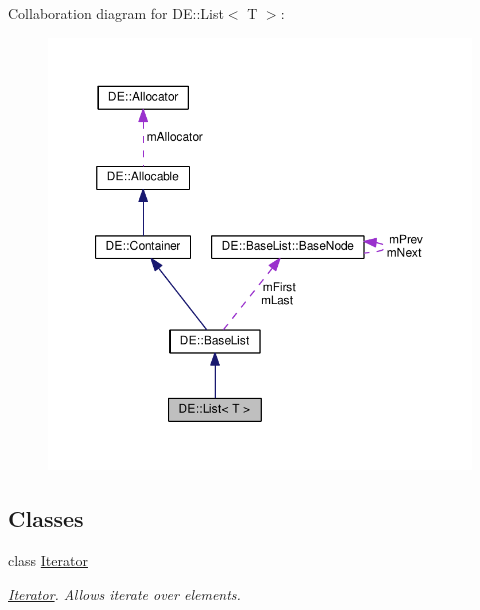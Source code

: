 Collaboration diagram for DE\+:\+:List$<$ T $>$\+:
\nopagebreak
\begin{figure}[H]
\begin{center}
\leavevmode
\includegraphics[width=350pt]{classDE_1_1List__coll__graph}
\end{center}
\end{figure}
\subsection*{Classes}
\begin{DoxyCompactItemize}
\item 
class \hyperlink{classDE_1_1List_1_1Iterator}{Iterator}
\begin{DoxyCompactList}\small\item\em \hyperlink{classDE_1_1List_1_1Iterator}{Iterator}. Allows iterate over elements. \end{DoxyCompactList}\end{DoxyCompactItemize}
